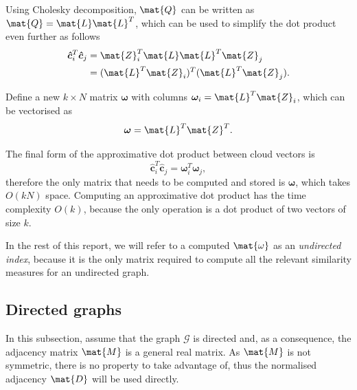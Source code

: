 \documentclass[12pt]{report}
\begin{document}
Using Cholesky decomposition, $\mat{Q}$ can be written as $\mat{Q} = \mat{L}
\mat{L}^T$, which can be used to simplify the dot product even further as
follows
\begin{align}
  \bm{\hat{c}}_i^T \bm{\hat{c}}_j &= \mat{Z}_i^T \mat{L} \mat{L}^T \mat{Z}_j \\
   &= (\mat{L}^T \mat{Z}_i)^T (\mat{L}^T \mat{Z}_j).
\end{align}

Define a new $k \times N$ matrix $\bm{\omega}$ with columns
$\bm{\omega}_i = \mat{L}^T \mat{Z}_i$, which can be vectorised as
\begin{equation}
  \bm{\omega} = \mat{L}^T \mat{Z}^T.
\end{equation}

The final form of the approximative dot product between cloud vectors is
\begin{equation}
  \bm{\hat{c}}_i^T \bm{\hat{c}}_j = \bm{\omega}_i^T \bm{\omega}_j,
\end{equation}
therefore the only matrix that needs to be computed and stored is $\bm{\omega}$,
which takes $O(kN)$ space. Computing an approximative dot product has the time
complexity $O(k)$, because the only operation is a dot product of two vectors of
size $k$.

In the rest of this report, we will refer to a computed $\mat{\omega}$ as an
\emph{undirected index}, because it is the only matrix required to compute all
the relevant similarity measures for an undirected graph.



%
%

\subsection{Directed graphs}

In this subsection, assume that the graph $\mathcal{G}$ is directed and, as a
consequence, the adjacency matrix $\mat{M}$ is a general real matrix. As
$\mat{M}$ is not symmetric, there is no property to take advantage of, thus
the normalised adjacency $\mat{D}$ will be used directly.
\end{document}
